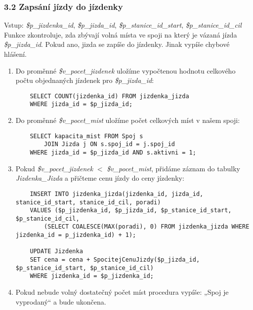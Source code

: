 \documentclass[11pt]{article}
\begin{document}

\subsubsection*{3.2	Zapsání jízdy do jízdenky}
Vstup: \textit{\$p\_jizdenka\_id}, \textit{\$p\_jizda\_id}, \textit{\$p\_stanice\_id\_start}, \textit{\$p\_stanice\_id\_cil}\\
Funkce zkontroluje, zda zbývají volná místa ve spoji na který je vázaná jízda \textit{\$p\_jizda\_id}. Pokud ano, jizda se zapíše do jízdenky. Jinak vypíše chybové hlášení.

\begin{enumerate}
    \item Do proměnné \textit{\$v\_pocet\_jizdenek} uložíme vypočtenou hodnotu celkového počtu objednaných jízdenek pro \textit{\$p\_jizda\_id}:
    \begin{lstlisting}
    SELECT COUNT(jizdenka_id) FROM jizdenka_jizda
    WHERE jizda_id = $p_jizda_id;
    \end{lstlisting}

    \item Do proměnné \textit{\$v\_pocet\_mist} uložíme počet celkových míst v našem spoji:
    \begin{lstlisting}
    SELECT kapacita_mist FROM Spoj s
        JOIN Jizda j ON s.spoj_id = j.spoj_id
    WHERE jizda_id = $p_jizda_id AND s.aktivni = 1;
    \end{lstlisting}

    \item Pokud \textit{\$v\_pocet\_jizdenek} $<$ \textit{\$v\_pocet\_mist}, přidáme záznam do tabulky \textit{Jizdenka\_Jizda} a přičteme cenu jízdy do ceny jízdenky:
    \begin{lstlisting}
    INSERT INTO jizdenka_jizda(jizdenka_id, jizda_id, stanice_id_start, stanice_id_cil, poradi)
    VALUES ($p_jizdenka_id, $p_jizda_id, $p_stanice_id_start, $p_stanice_id_cil, 
        (SELECT COALESCE(MAX(poradi), 0) FROM jizdenka_jizda WHERE jizdenka_id = p_jizdenka_id) + 1);
    
    UPDATE Jizdenka 
    SET cena = cena + SpocitejCenuJizdy($p_jizda_id, $p_stanice_id_start, $p_stanice_id_cil) 
    WHERE jizdenka_id = $p_jizdenka_id;
    \end{lstlisting}

    \item Pokud nebude volný dostatečný počet míst procedura vypíše: „Spoj je vyprodaný“ a bude ukončena.
\end{enumerate}
\end{document}
